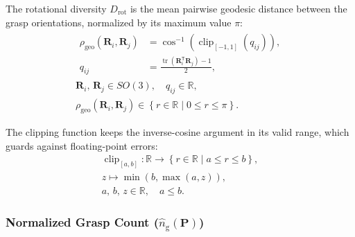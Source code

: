 The rotational diversity $D_{\mathrm{rot}}$ is the mean pairwise geodesic
distance between the grasp orientations, normalized by its maximum value $\pi$:
\begin{equation}
    \label{eq:grasp_geodesic}
    \begin{gathered}
        \begin{aligned}
            \rho_{\mathrm{geo}}(\mathbf{R}_{i},\mathbf{R}_{j})
            &=
            \cos^{-1}\!\left( \operatorname{clip}_{[-1,1]}(q_{ij}) \right),
            \\[3pt]
            q_{ij}
            &=
            \frac{\operatorname{tr}(\mathbf{R}_{i}^{\mathsf{T}}\mathbf{R}_{j}) - 1}{2},
        \end{aligned}
        \\[4pt]
        \mathbf{R}_{i},\, \mathbf{R}_{j} \in SO(3),
        \quad
        q_{ij} \in \mathbb{R},
        \\[2pt]
        \rho_{\mathrm{geo}}(\mathbf{R}_{i},\mathbf{R}_{j})
        \in \left\{ r \in \mathbb{R} \mid 0 \le r \le \pi \right\}.
    \end{gathered}
\end{equation}

The clipping function keeps the inverse-cosine argument in its valid range,
which guards against floating-point errors:
\begin{equation}
    \label{eq:clip-function}
    \begin{gathered}
        \operatorname{clip}_{[a,b]} :
        \mathbb{R} \rightarrow \left\{ r \in \mathbb{R} \mid a \le r \le b \right\},
        \\[2pt]
        z \mapsto \min\!\left( b, \max(a,z) \right),
        \\[4pt]
        a,\, b,\, z \in \mathbb{R},
        \quad
        a \le b.
    \end{gathered}
\end{equation}

    \subsubsection{Normalized Grasp Count ($\hat{n}_{\mathrm{g}}(\mathbf{P})$)}

